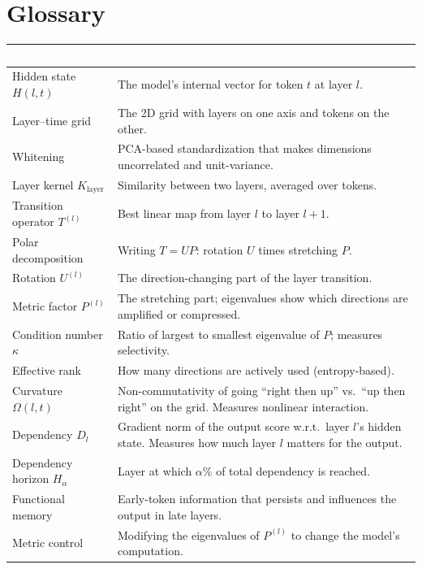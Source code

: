 \documentclass[11pt, twoside, openright]{memoir}
\begin{document}
\backmatter

\chapter*{Glossary}

\begin{center}
\renewcommand{\arraystretch}{1.5}\small
\begin{tabular}{@{}L{3.5cm} L{7.5cm}@{}}
\toprule
{}
\textcolor{white}{\textbf{Term}} &
\textcolor{white}{\textbf{Plain-language definition}} \\
\midrule
Hidden state $H(l,t)$ &
  The model's internal vector for token $t$ at layer $l$. \\
Layer--time grid &
  The 2D grid with layers on one axis and tokens on the other. \\
Whitening &
  PCA-based standardization that makes dimensions uncorrelated
  and unit-variance. \\
Layer kernel $K_{\text{layer}}$ &
  Similarity between two layers, averaged over tokens. \\
Transition operator $T^{(l)}$ &
  Best linear map from layer $l$ to layer $l+1$. \\
Polar decomposition &
  Writing $T = UP$: rotation $U$ times stretching $P$. \\
Rotation $U^{(l)}$ &
  The direction-changing part of the layer transition. \\
Metric factor $P^{(l)}$ &
  The stretching part; eigenvalues show which directions are
  amplified or compressed. \\
Condition number $\kappa$ &
  Ratio of largest to smallest eigenvalue of $P$; measures
  selectivity. \\
Effective rank &
  How many directions are actively used (entropy-based). \\
Curvature $\Omega(l,t)$ &
  Non-commutativity of going ``right then up'' vs.\ ``up then right''
  on the grid. Measures nonlinear interaction. \\
Dependency $D_l$ &
  Gradient norm of the output score w.r.t.\ layer $l$'s hidden
  state. Measures how much layer $l$ matters for the output. \\
Dependency horizon $H_\alpha$ &
  Layer at which $\alpha\%$ of total dependency is reached. \\
Functional memory &
  Early-token information that persists and influences the output
  in late layers. \\
Metric control &
  Modifying the eigenvalues of $P^{(l)}$ to change the model's
  computation. \\
\bottomrule
\end{tabular}
\end{center}
\end{document}

